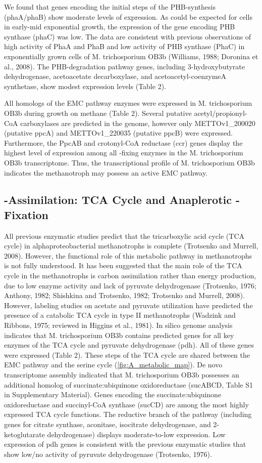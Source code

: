 We found that genes encoding the initial steps of the PHB-synthesis (phaA/phaB) show moderate levels of expression.
As could be expected for cells in early-mid exponential growth, the expression of the gene encoding PHB synthase (phaC) was low.
The data are consistent with previous observations of high activity of PhaA and PhaB and low activity of PHB synthase (PhaC) in exponentially grown cells of M. trichosporium OB3b (Williams, 1988; Doronina et al., 2008).
The PHB-degradation pathway genes, including 3-hydroxybutyrate dehydrogenase, acetoacetate decarboxylase, and acetoacetyl-coenzymeA synthetase, show modest expression levels (Table 2).

All homologs of the EMC pathway enzymes were expressed in M. trichosporium OB3b during growth on methane (Table 2).
Several putative acetyl/propionyl-CoA carboxylases are predicted in the genome, however only METTOv1\_200020 (putative ppcA) and METTOv1\_220035 (putative ppcB) were expressed.
Furthermore, the PpcAB and crotonyl-CoA reductase (ccr) genes display the highest level of expression among all -fixing enzymes in the M. trichosporium OB3b transcriptome.
Thus, the transcriptional profile of M. trichosporium OB3b indicates the methanotroph may possess an active EMC pathway.

\subsection{-Assimilation: TCA Cycle and Anaplerotic -Fixation}
All previous enzymatic studies predict that the tricarboxylic acid cycle (TCA cycle) in alphaproteobacterial methanotrophs is complete (Trotsenko and Murrell, 2008).
However, the functional role of this metabolic pathway in methanotrophs is not fully understood.
It has been suggested that the main role of the TCA cycle in the methanotrophs is carbon assimilation rather than energy production, due to low enzyme activity and lack of pyruvate dehydrogenase (Trotsenko, 1976; Anthony, 1982; Shishkina and Trotsenko, 1982; Trotsenko and Murrell, 2008).
However, labeling studies on acetate and pyruvate utilization have predicted the presence of a catabolic TCA cycle in type II methanotrophs (Wadzink and Ribbons, 1975; reviewed in Higgins et al., 1981).
In silico genome analysis indicates that M. trichosporium OB3b contains predicted genes for all key enzymes of the TCA cycle and pyruvate dehydrogenase (pdh).
All of these genes were expressed (Table 2).
These steps of the TCA cycle are shared between the EMC pathway and the serine cycle (\ref{fig:A_metabolic_map}).
De novo transcriptome assembly indicated that M. trichosporium OB3b possesses an additional homolog of succinate:ubiquinone oxidoreductase (sucABCD, Table S1 in Supplementary Material).
Genes encoding the succinate:ubiquinone oxidoreductase and succinyl-CoA synthase (sucCD) are among the most highly expressed TCA cycle functions.
The reductive branch of the pathway (including genes for citrate synthase, aconitase, isocitrate dehydrogenase, and 2-ketoglutarate dehydrogenase) displays moderate-to-low expression.
Low expression of pdh genes is consistent with the previous enzymatic studies that show low/no activity of pyruvate dehydrogenase (Trotsenko, 1976).

